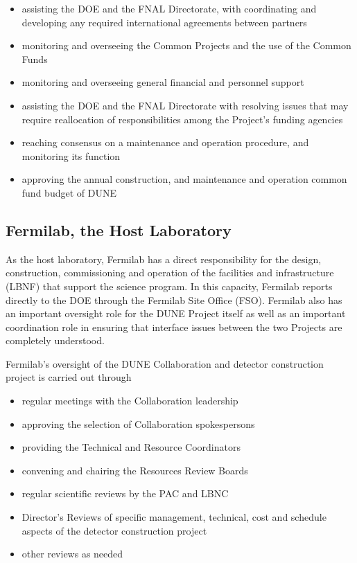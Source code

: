 \begin{itemize}
\item assisting the DOE and the FNAL Directorate,
with coordinating and developing any required international
agreements between partners
\item monitoring and overseeing the Common Projects and the
use of the Common Funds
\item monitoring and overseeing general financial and personnel support
\item assisting the DOE and the FNAL Directorate
with resolving issues that may require reallocation of responsibilities
among the Project's funding agencies
\item reaching consensus on a maintenance and operation procedure,
and monitoring its function
\item  approving the annual construction, and maintenance and operation common fund 
budget of DUNE
\end{itemize}

\subsection{Fermilab, the Host Laboratory}

As the host laboratory, Fermilab has a direct responsibility for the design,
construction, commissioning and operation of the facilities and
infrastructure (LBNF) that support the science program. 
In this capacity, Fermilab reports
directly to the DOE through the Fermilab Site Office (FSO).
Fermilab also has an important oversight role for the DUNE Project
itself as well as an important coordination role in ensuring that
interface issues between the two Projects are completely understood.

Fermilab's oversight of the DUNE Collaboration and detector
construction project is carried out through
\begin{itemize}
\item regular meetings with the Collaboration leadership
\item approving the selection of Collaboration spokespersons
\item  providing the Technical and Resource Coordinators
\item  convening and chairing the Resources Review Boards
\item  regular scientific reviews by the PAC and LBNC
\item  Director's Reviews of specific management, technical,
cost and schedule aspects of the detector construction project
\item other reviews as needed
\end{itemize}

